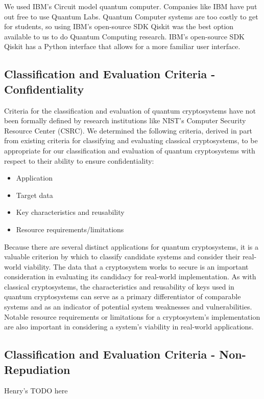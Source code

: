 \documentclass[sigconf]{acmart}
\begin{document}
We used IBM’s Circuit model quantum computer. Companies like IBM have put out free to use Quantum Labs. Quantum Computer systems are too costly to get for students, so using IBM’s open-source SDK Qiskit was the best option available to us to do Quantum Computing research. IBM’s open-source SDK Qiskit has a Python interface that allows for a more familiar user interface.

\subsection{Classification and Evaluation Criteria - Confidentiality} %
Criteria for the classification and evaluation of quantum cryptosystems have not been formally defined by research institutions like NIST’s Computer Security Resource Center (CSRC). We determined the following criteria, derived in part from existing criteria for classifying and evaluating classical cryptosystems, to be appropriate for our classification and evaluation of quantum cryptosystems with respect to their ability to ensure confidentiality: %
\begin{itemize}
\item Application %
\item Target data
\item Key characteristics and reusability
\item Resource requirements/limitations
\end{itemize}

Because there are several distinct applications for quantum cryptosystems, it is a valuable criterion by which to classify candidate systems and consider their real-world viability. The data that a cryptosystem works to secure is an important consideration in evaluating its candidacy for real-world implementation. As with classical cryptosystems, the characteristics and reusability of keys used in quantum cryptosystems can serve as a primary differentiator of comparable systems and as an indicator of potential system weaknesses and vulnerabilities. Notable resource requirements or limitations for a cryptosystem’s implementation are also important in considering a system’s viability in real-world applications.

\subsection{Classification and Evaluation Criteria - Non-Repudiation}
Henry's TODO here
\end{document}
